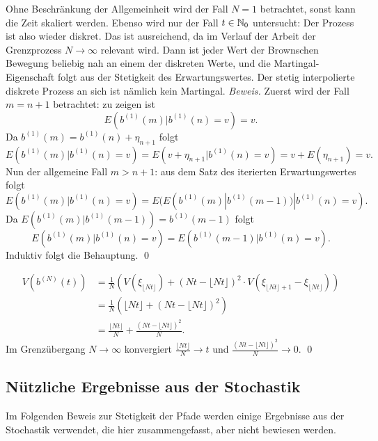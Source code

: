 \begin{lemma}
Ohne Beschränkung der Allgemeinheit wird der Fall $N=1$ betrachtet, sonst kann die Zeit skaliert werden.
Ebenso wird nur der Fall $t \in \Bbb N_0$ untersucht: Der Prozess ist also wieder diskret. Das ist
ausreichend, da im Verlauf der Arbeit der Grenzprozess $N \to \infty$ relevant 
wird. Dann ist jeder Wert der Brownschen Bewegung beliebig nah an einem der diskreten Werte, 
und die Martingal-Eigenschaft folgt aus der Stetigkeit des Erwartungswertes. Der stetig interpolierte 
diskrete Prozess an sich ist nämlich kein Martingal. \textit{Beweis.}
Zuerst wird der Fall $m=n+1$ betrachtet: zu zeigen ist
$$E(b^{(1)}(m) | b^{(1)}(n)=v) = v.$$
Da $b^{(1)}(m) = b^{(1)}(n) + \eta_{n+1}$ folgt
$$E(b^{(1)}(m) | b^{(1)}(n)=v) = E(v + \eta_{n+1} | b^{(1)}(n)=v) = v + E(\eta_{n+1}) = v.$$
Nun der allgemeine Fall $m > n+1$: aus dem Satz des iterierten Erwartungswertes folgt
$$E(b^{(1)}(m) | b^{(1)}(n)=v) = E(E(b^{(1)}(m) | b^{(1)}(m-1)) | b^{(1)}(n)=v).$$
Da $E(b^{(1)}(m) | b^{(1)}(m-1)) = b^{(1)}(m-1)$ folgt
$$E(b^{(1)}(m) | b^{(1)}(n)=v) = E(b^{(1)}(m-1) | b^{(1)}(n)=v).$$
Induktiv folgt die Behauptung. \qed \\

\end{lemma}

\begin{lemma}
$$
\begin{aligned}
V(b^{(N)}(t)) &= \frac{1}{N} \left ( V(\xi_{\lfloor Nt \rfloor}) + (Nt - \lfloor Nt \rfloor)^2 \cdot V(\xi_{\lfloor Nt \rfloor + 1} - \xi_{\lfloor Nt \rfloor}) \right ) 
\\ &= \frac{1}{N} (\lfloor Nt \rfloor + (Nt - \lfloor Nt \rfloor)^2)  
\\ &= \frac{\lfloor Nt \rfloor}{N} + \frac{(Nt - \lfloor Nt \rfloor)^2}{N}.
\end{aligned}
$$
Im Grenzübergang $N \to \infty$ konvergiert $\frac{\lfloor Nt \rfloor}{N} \to t$ und $\frac{(Nt - \lfloor Nt \rfloor)^2}{N} \to 0$.
\qed
\end{lemma}

\subsection{Nützliche Ergebnisse aus der Stochastik}
Im Folgenden Beweis zur Stetigkeit der Pfade werden einige Ergebnisse aus der Stochastik verwendet, die hier zusammengefasst, aber nicht bewiesen werden.

